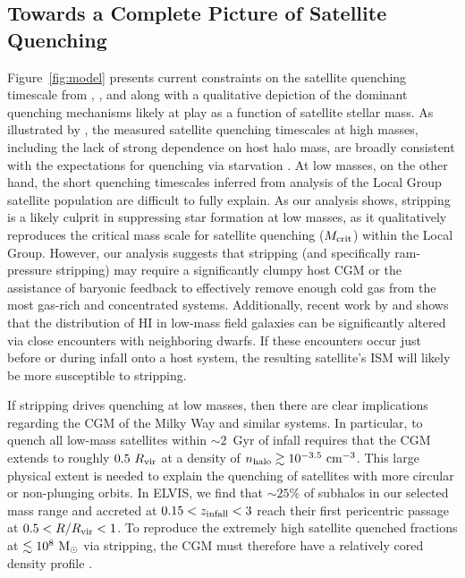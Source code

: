 \documentclass[usenatbib]{mn2e}
\newcommand{\msun}{{\rm M}_{\odot}}
\begin{document}



\subsection{Towards a Complete Picture of Satellite Quenching}
\label{subsec:BigPic}


Figure~\ref{fig:model} presents current constraints on the satellite
quenching timescale from \citet{wetzel13}, \citet{wheeler14}, and
\citet{fham15} along with a qualitative depiction of the dominant
quenching mechanisms likely at play as a function of satellite stellar
mass.
%
As illustrated by \citet{fham15}, the measured satellite quenching
timescales at high masses, including the lack of strong dependence on
host halo mass, are broadly consistent with the expectations for
quenching via starvation \citep[see also][]{vdb08, wetzel13}.
%
At low masses, on the other hand, the short quenching timescales
inferred from analysis of the Local Group satellite population are
difficult to fully explain.
%
As our analysis shows, stripping is a likely culprit in suppressing
star formation at low masses, as it qualitatively reproduces the
critical mass scale for satellite quenching ($M_{\rm crit}$) within
the Local Group.
%
However, our analysis suggests that stripping (and specifically
ram-pressure stripping) may require a significantly clumpy host CGM or
the assistance of baryonic feedback to effectively remove enough cold
gas from the most gas-rich and concentrated systems.
%
Additionally, recent work by \citet{pearson16} and \citet{marasco16}
shows that the distribution of H{\scriptsize I} in low-mass field
galaxies can be significantly altered via close encounters with
neighboring dwarfs. 
If these encounters occur just before or during infall onto a host
system, the resulting satellite's ISM will likely be more susceptible to
stripping. 
%

If stripping drives quenching at low masses, then there are clear
implications regarding the CGM of the Milky Way and similar systems. 
%
In particular, to quench all low-mass satellites within $\sim2$~Gyr of
infall requires that the CGM extends to roughly $0.5~R_{\rm vir}$
\citep[or $\sim150$~kpc,][]{fham15} at a density of $n_{\rm halo}
\gtrsim 10^{-3.5}~{\rm cm}^{-3}$.
%
This large physical extent is needed to explain the quenching of
satellites with more circular or non-plunging orbits.
In ELVIS, we find that $\sim 25\%$ of subhalos in our selected mass
range and accreted at $0.15 < z_{\rm infall} < 3$ reach their first
pericentric passage at $0.5 < R/R_{\rm vir} < 1$.
%
To reproduce the extremely high satellite quenched fractions at
$\lesssim10^{8}~\msun$ via stripping, the CGM must therefore have a
relatively cored density profile \citep[e.g.][]{MB04}.
\end{document}
